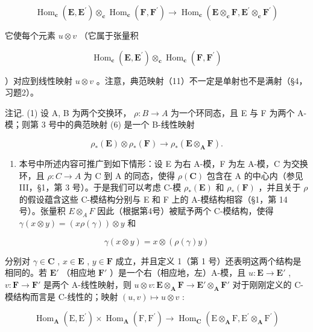 \[
\operatorname{Hom} _ {\mathbf {c}} (\mathbf {E}, \mathbf {E} ^ {\prime}) \otimes_ {\mathbf {c}} \operatorname{Hom} _ {\mathbf {c}} (\mathbf {F}, \mathbf {F} ^ {\prime}) \to \operatorname{Hom} _ {\mathbf {c}} (\mathbf {E} \otimes_ {\mathbf {c}} \mathbf {F}, \mathbf {E} ^ {\prime} \otimes_ {\mathbf {c}} \mathbf {F} ^ {\prime})\tag{11}
\]

它使每个元素 \(u \otimes v\) （它属于张量积

\[
\operatorname{Hom} _ {\mathbf {c}} (\mathbf {E}, \mathbf {E} ^ {\prime}) \otimes_ {\mathbf {c}} \operatorname{Hom} _ {\mathbf {c}} (\mathbf {F}, \mathbf {F} ^ {\prime})
\]

）对应到线性映射 \(u \otimes v\) 。注意，典范映射（11）不一定是单射也不是满射（§4，习题2）。

注记. (1) 设 A, B 为两个交换环， \(\rho:B\to A\) 为一个环同态，且 E 与 F 为两个 A-模；则第 3 号中的典范映射 (6) 是一个 B-线性映射

\[
\rho_ {*} (\mathbf {E}) \otimes \rho_ {*} (\mathbf {F}) \rightarrow \rho_ {*} (\mathbf {E} \otimes_ {\mathbf {A}} \mathbf {F}).\tag{12}
\]

\begin{enumerate}
\def\labelenumi{(\arabic{enumi})}
\setcounter{enumi}{1}
\tightlist
\item
  本号中所述内容可推广到如下情形：设 E 为右 A-模，F 为左 A-模，C 为交换环，且 \(\rho:C\to A\) 为 C 到 A 的同态，使得 \(\rho(\mathbf{C})\) 包含在 A 的中心内（参见 III，§1，第 3 号）。于是我们可以考虑 C-模 \(\rho_{*}(\mathbf{E})\) 和 \(\rho_{*}(\mathbf{F})\) ，并且关于 \(\rho\) 的假设蕴含这些 C-模结构分别与 E 和 F 上的 A-模结构相容（§1，第 14 号）。张量积 \(E\otimes_{A}F\) 因此（根据第4号）被赋予两个 C-模结构，使得 \(\gamma(x\otimes y)=(x\rho(\gamma))\otimes y\) 和
\end{enumerate}

\[
\gamma (x \otimes y) = x \otimes (\rho (\gamma) y)
\]

分别对 \(\gamma\in\mathbf{C}\) , \(x\in\mathbf{E}\) , \(y\in\mathbf{F}\) 成立，并且定义 1（第 1 号）还表明这两个结构是相同的。若 \(\mathbf{E}'\) （相应地 \(\mathbf{F}'\) ）是一个右（相应地，左）A-模，且 \(u:\mathbf{E}\to\mathbf{E}'\) , \(v:\mathbf{F}\to\mathbf{F}'\) 是两个 A-线性映射，则 \(u\otimes v:\mathbf{E}\otimes_{\mathbf{A}}\mathbf{F}\to\mathbf{E}'\otimes_{\mathbf{A}}\mathbf{F}'\) 对于刚刚定义的 C-模结构而言是 C-线性的；映射 \((u,v)\mapsto u\otimes v\) :

\[
\operatorname{Hom} _ {\mathbf {A}} (\mathrm{E}, \mathrm{E} ^ {\prime}) \times \operatorname{Hom} _ {\mathbf {A}} (\mathrm{F}, \mathrm{F} ^ {\prime}) \rightarrow \operatorname{Hom} _ {\mathbf {C}} (\mathrm{E} \otimes_ {\mathbf {A}} \mathrm{F}, \mathrm{E} ^ {\prime} \otimes_ {\mathbf {A}} \mathrm{F} ^ {\prime})
\]

